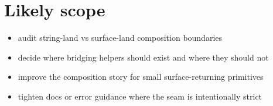 \section{Likely scope}\label{record-336-likely-scope}

\begin{itemize}
\tightlist
\item
  audit string-land vs surface-land composition boundaries
\item
  decide where bridging helpers should exist and where they should not
\item
  improve the composition story for small surface-returning primitives
\item
  tighten docs or error guidance where the seam is intentionally strict
\end{itemize}

